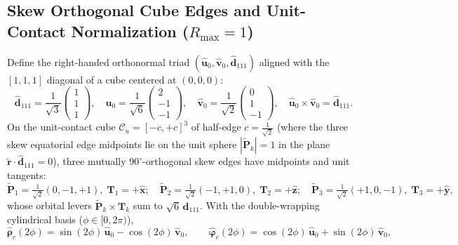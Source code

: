 \documentclass[11pt, a4paper]{article}
\DeclareRobustCommand{\Rmax}{R_{\max}}
\begin{document}
\subsection{\texorpdfstring{Skew Orthogonal Cube Edges and Unit-Contact Normalization ($\Rmax = 1$)}{Skew Orthogonal Cube Edges and Unit-Contact Normalization}}
Define the right-handed orthonormal triad $(\hat{\mathbf{u}}_0, \hat{\mathbf{v}}_0, \hat{\mathbf{d}}_{111})$ aligned with the $[1,1,1]$ diagonal of a cube centered at $(0,0,0)$:
\begin{equation}
    \hat{\mathbf{d}}_{111} = \frac{1}{\sqrt{3}}\begin{pmatrix} 1 \\ 1 \\ 1 \end{pmatrix}, \quad
    \hat{\mathbf{u}}_0 = \frac{1}{\sqrt{6}}\begin{pmatrix} 2 \\ -1 \\ -1 \end{pmatrix}, \quad
    \hat{\mathbf{v}}_0 = \frac{1}{\sqrt{2}}\begin{pmatrix} 0 \\ 1 \\ -1 \end{pmatrix}, \quad
    \hat{\mathbf{u}}_0 \times \hat{\mathbf{v}}_0 = \hat{\mathbf{d}}_{111}.
    \label{eq:triad_111}
\end{equation}
On the unit-contact cube $\mathcal{C}_u = [-c, +c]^3$ of half-edge $c = \frac{1}{\sqrt{2}}$ (where the three skew equatorial edge midpoints lie on the unit sphere $|\tilde{\mathbf{P}}_k| = 1$ in the plane $\tilde{\mathbf{r}}\cdot\hat{\mathbf{d}}_{111} = 0$), three mutually $90^\circ$-orthogonal skew edges have midpoints and unit tangents:
\begin{equation}
    \tilde{\mathbf{P}}_1 = \tfrac{1}{\sqrt{2}}(0,-1,+1),\; \mathbf{T}_1 = +\hat{\mathbf{x}}; \quad
    \tilde{\mathbf{P}}_2 = \tfrac{1}{\sqrt{2}}(-1,+1,0),\; \mathbf{T}_2 = +\hat{\mathbf{z}}; \quad
    \tilde{\mathbf{P}}_3 = \tfrac{1}{\sqrt{2}}(+1,0,-1),\; \mathbf{T}_3 = +\hat{\mathbf{y}},
    \label{eq:three_skew_edges}
\end{equation}
whose orbital levers $\tilde{\mathbf{P}}_k \times \mathbf{T}_k$ sum to $\sqrt{6}\,\hat{\mathbf{d}}_{111}$. With the double-wrapping cylindrical basis ($\phi \in [0, 2\pi)$),
\begin{equation}
    \hat{\boldsymbol{\rho}}_c(2\phi) = \sin(2\phi)\,\hat{\mathbf{u}}_0 - \cos(2\phi)\,\hat{\mathbf{v}}_0, \qquad
    \hat{\boldsymbol{\varphi}}_c(2\phi) = \cos(2\phi)\,\hat{\mathbf{u}}_0 + \sin(2\phi)\,\hat{\mathbf{v}}_0,
    \label{eq:double_wrap_basis}
\end{equation}
\end{document}

